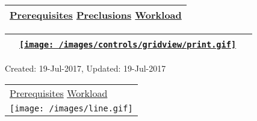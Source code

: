 \hypertarget{ctl00_ctl00_ContentPlaceHolder1_ContentPlaceHolder1_pnlReferences}{}
\begin{longtable}[]{@{}l@{}}
\toprule
\protect\hypertarget{ctl00_ctl00_ContentPlaceHolder1_ContentPlaceHolder1_lblSectionBottom}{}{\protect\hyperlink{Prerequisites}{Prerequisites}
\textbar{} \protect\hyperlink{Preclusions}{Preclusions} \textbar{}
\protect\hyperlink{Workload}{Workload}}\tabularnewline
\bottomrule
\end{longtable}

\hypertarget{ctl00_ctl00_ContentPlaceHolder1_ContentPlaceHolder1_UP}{}
\hypertarget{contentstart}{}
\hypertarget{ctl00_ctl00_ContentPlaceHolder1_ContentPlaceHolder1_pnlMain}{}
\begin{longtable}[]{@{}ll@{}}
\toprule
&
{\href{javascript:PrintThisPage();}{\texttt{[image: /images/controls/gridview/print.gif]}}~~}\tabularnewline
\bottomrule
\end{longtable}

\protect\hypertarget{ctl00_ctl00_ContentPlaceHolder1_ContentPlaceHolder1_LV_UpdateInfo_ctrl0_txtDate}{}{Created:
19-Jul-2017, Updated: 19-Jul-2017}

\begin{longtable}[]{@{}l@{}}
\toprule
\protect\hypertarget{ctl00_ctl00_ContentPlaceHolder1_ContentPlaceHolder1_lblSectionTop}{}{\protect\hyperlink{Prerequisites}{Prerequisites}
\textbar{} \protect\hyperlink{Workload}{Workload}}\tabularnewline
\texttt{[image: /images/line.gif]}\tabularnewline
\bottomrule
\end{longtable}

